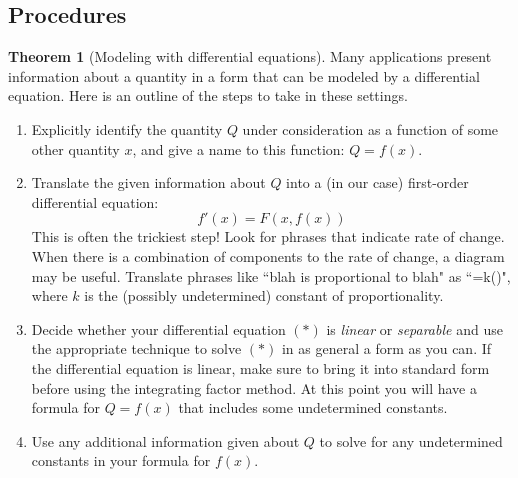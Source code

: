\documentclass[11pt]{article}
\theoremstyle{definition}
\theoremstyle{named}
\newtheorem*{namedtheorem}{Theorem}
\numberwithin{myalgctr}{section}
\begin{document}
\thispagestyle{fancy}

\subsection*{Procedures}
\begin{namedtheorem}[Modeling with differential equations] Many applications present information about a quantity in a form that can be modeled by a differential equation. Here is an outline of the steps to take in these settings.
  \begin{enumerate}
    \item Explicitly identify the quantity $Q$ under consideration as a function of some other quantity $x$, and give a name to this function: $Q=f(x)$.
    \item Translate the given information about $Q$ into a (in our case) first-order differential equation:
    \[
    f'(x)=F(x, f(x)) \tag{$*$}
    \]
    This is often the trickiest step! Look for phrases that indicate rate of change. When there is a combination of components to the rate of change, a diagram may be useful. Translate phrases like ``blah is proportional to blah" as ``=k()", where $k$ is the (possibly undetermined) constant of proportionality.
    \item Decide whether your differential equation $(*)$ is {\em linear} or {\em separable} and use the appropriate technique to solve $(*)$ in as general a form as you can. If the differential equation is linear, make sure to bring it into standard form before using the integrating factor method. At this point you will have a formula for $Q=f(x)$ that includes some undetermined constants.
    \item Use any additional information given about $Q$ to solve for any undetermined constants in your formula for $f(x)$.
  \end{enumerate}

\end{namedtheorem}
\end{document}
